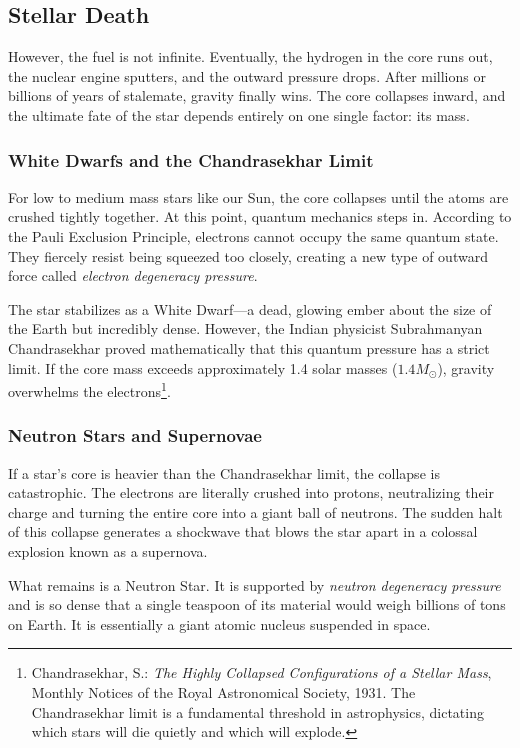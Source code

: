 \documentclass[10pt,a4paper]{article}
\begin{document}
\subsection{Stellar Death}
However, the fuel is not infinite. Eventually, the hydrogen in the core runs out, the nuclear engine sputters, and the outward pressure drops. After millions or billions of years of stalemate, gravity finally wins. The core collapses inward, and the ultimate fate of the star depends entirely on one single factor: its mass.

\subsubsection{White Dwarfs and the Chandrasekhar Limit}
For low to medium mass stars like our Sun, the core collapses until the atoms are crushed tightly together. At this point, quantum mechanics steps in. According to the Pauli Exclusion Principle, electrons cannot occupy the same quantum state. They fiercely resist being squeezed too closely, creating a new type of outward force called \textit{electron degeneracy pressure}. 

The star stabilizes as a White Dwarf—a dead, glowing ember about the size of the Earth but incredibly dense. However, the Indian physicist Subrahmanyan Chandrasekhar proved mathematically that this quantum pressure has a strict limit. If the core mass exceeds approximately 1.4 solar masses ($1.4 M_\odot$), gravity overwhelms the electrons\footnote{Chandrasekhar, S.: \textit{The Highly Collapsed Configurations of a Stellar Mass}, Monthly Notices of the Royal Astronomical Society, 1931. The Chandrasekhar limit is a fundamental threshold in astrophysics, dictating which stars will die quietly and which will explode.}.

\subsubsection{Neutron Stars and Supernovae}
If a star's core is heavier than the Chandrasekhar limit, the collapse is catastrophic. The electrons are literally crushed into protons, neutralizing their charge and turning the entire core into a giant ball of neutrons. The sudden halt of this collapse generates a shockwave that blows the star apart in a colossal explosion known as a supernova.

What remains is a Neutron Star. It is supported by \textit{neutron degeneracy pressure} and is so dense that a single teaspoon of its material would weigh billions of tons on Earth. It is essentially a giant atomic nucleus suspended in space.
\end{document}
